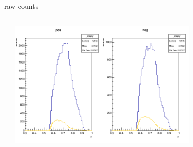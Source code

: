 \begin{frame}{raw counts}
\begin{columns}
\begin{column}[T]{0.5\textwidth}
\end{column}
\begin{column}[T]{0.5\textwidth}
\includegraphics[width = 0.7\textwidth]{results/yield/statistics/counts_x_Q2_z_0.60_4.775_0.70.png}
\end{column}
\end{columns}
\end{frame}
